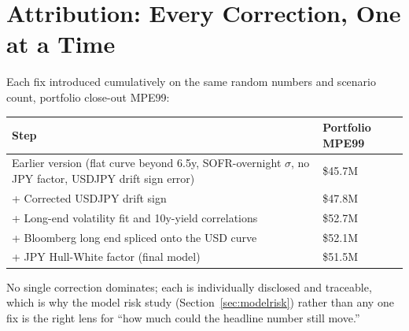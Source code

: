 \documentclass[10pt,letterpaper]{article}
\begin{document}
\section{Attribution: Every Correction, One at a Time}\label{sec:attribution}
Each fix introduced cumulatively on the same random numbers and scenario count, portfolio close-out MPE99:
\begin{center}\small
\begin{tabular}{p{}p{}}
\toprule
\textbf{Step} & \textbf{Portfolio MPE99} \\
\midrule
Earlier version (flat curve beyond 6.5y, SOFR-overnight $\sigma$, no JPY factor, USDJPY drift sign error) & \$45.7M \\
+ Corrected USDJPY drift sign & \$47.8M \\
+ Long-end volatility fit and 10y-yield correlations & \$52.7M \\
+ Bloomberg long end spliced onto the USD curve & \$52.1M \\
+ JPY Hull-White factor (final model) & \$51.5M \\
\bottomrule
\end{tabular}
\end{center}
No single correction dominates; each is individually disclosed and traceable, which is why the model risk study (Section~\ref{sec:modelrisk}) rather than any one fix is the right lens for ``how much could the headline number still move.''
\end{document}
